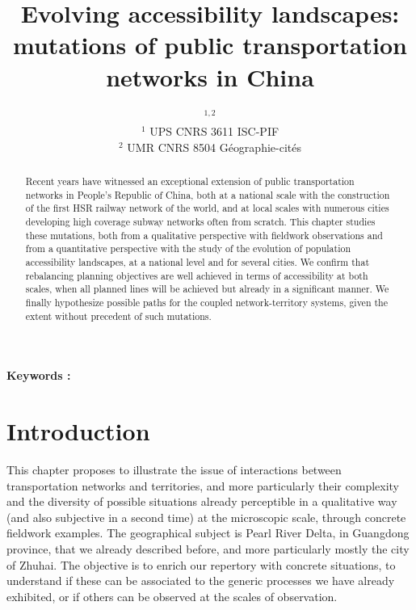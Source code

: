 


\title{Evolving accessibility landscapes: mutations of public transportation networks in China}
\author{$^{1,2}$\\
$^1$ UPS CNRS 3611 ISC-PIF\\
$^2$ UMR CNRS 8504 G{\'e}ographie-cit{\'e}s
}
\date{}


\maketitle

\justify


\begin{abstract}
Recent years have witnessed an exceptional extension of public transportation networks in People's Republic of China, both at a national scale with the construction of the first HSR railway network of the world, and at local scales with numerous cities developing high coverage subway networks often from scratch. This chapter studies these mutations, both from a qualitative perspective with fieldwork observations and from a quantitative perspective with the study of the evolution of population accessibility landscapes, at a national level and for several cities. We confirm that rebalancing planning objectives are well achieved in terms of accessibility at both scales, when all planned lines will be achieved but already in a significant manner. We finally hypothesize possible paths for the coupled network-territory systems, given the extent without precedent of such mutations.
\end{abstract}

\textbf{Keywords : }\textit{}



\section{Introduction}

This chapter proposes to illustrate the issue of interactions between transportation networks and territories, and more particularly their complexity and the diversity of possible situations already perceptible in a qualitative way (and also subjective in a second time) at the microscopic scale, through concrete fieldwork examples. The geographical subject is Pearl River Delta, in Guangdong province, that we already described before, and more particularly mostly the city of Zhuhai. The objective is to enrich our repertory with concrete situations, to understand if these can be associated to the generic processes we have already exhibited, or if others can be observed at the scales of observation.



